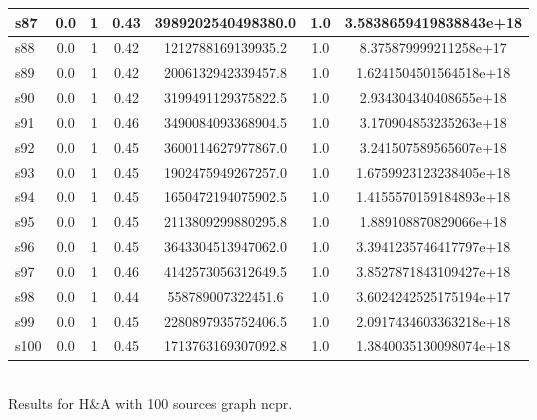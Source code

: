 \documentclass{article}
\begin{document}
\begin{tabular}{|l|c|c|c|c|c|c|}
\hline
s87 &0.0 & 1 & 0.43 & 3989202540498380.0 & 1.0 & 3.5838659419838843e+18\\
\hline
s88 &0.0 & 1 & 0.42 & 1212788169139935.2 & 1.0 & 8.375879999211258e+17\\
\hline
s89 &0.0 & 1 & 0.42 & 2006132942339457.8 & 1.0 & 1.6241504501564518e+18\\
\hline
s90 &0.0 & 1 & 0.42 & 3199491129375822.5 & 1.0 & 2.934304340408655e+18\\
\hline
s91 &0.0 & 1 & 0.46 & 3490084093368904.5 & 1.0 & 3.170904853235263e+18\\
\hline
s92 &0.0 & 1 & 0.45 & 3600114627977867.0 & 1.0 & 3.241507589565607e+18\\
\hline
s93 &0.0 & 1 & 0.45 & 1902475949267257.0 & 1.0 & 1.6759923123238405e+18\\
\hline
s94 &0.0 & 1 & 0.45 & 1650472194075902.5 & 1.0 & 1.4155570159184893e+18\\
\hline
s95 &0.0 & 1 & 0.45 & 2113809299880295.8 & 1.0 & 1.889108870829066e+18\\
\hline
s96 &0.0 & 1 & 0.45 & 3643304513947062.0 & 1.0 & 3.3941235746417797e+18\\
\hline
s97 &0.0 & 1 & 0.46 & 4142573056312649.5 & 1.0 & 3.8527871843109427e+18\\
\hline
s98 &0.0 & 1 & 0.44 & 558789007322451.6 & 1.0 & 3.6024242525175194e+17\\
\hline
s99 &0.0 & 1 & 0.45 & 2280897935752406.5 & 1.0 & 2.0917434603363218e+18\\
\hline
s100 &0.0 & 1 & 0.45 & 1713763169307092.8 & 1.0 & 1.3840035130098074e+18\\
\hline
\end{tabular}\\

\noindent Results for H\&A with 100 sources graph ncpr.
\end{document}
